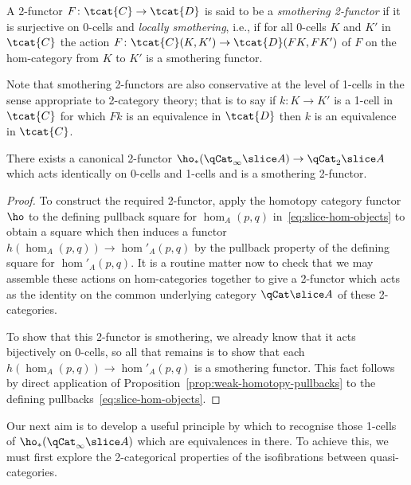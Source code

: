\begin{defn}\label{defn:smothering-2-functor}
  A 2-functor $F\colon\tcat{C}\to\tcat{D}$ is said to be a {\em smothering 2-functor\/} if it is surjective on 0-cells and \emph{locally smothering}, i.e., if for all 0-cells $K$ and $K'$ in $\tcat{C}$ the action $F\colon \tcat{C}(K,K')\to\tcat{D}(FK,FK')$ of $F$ on the hom-category from $K$ to $K'$ is a smothering functor.

Note that smothering 2-functors are also conservative at the level of 1-cells in the sense appropriate to 2-category theory; that is to say if $k\colon K\to K'$ is a 1-cell in $\tcat{C}$ for which $Fk$ is an equivalence in $\tcat{D}$ then $k$ is an equivalence in $\tcat{C}$.
\end{defn}

\begin{prop}\label{prop:slice-smothering-2-functor} There exists a canonical 2-functor $\ho_*(\qCat_\infty\slice A)\to\qCat_2\slice A$  which acts identically on 0-cells and 1-cells and is a smothering 2-functor.
\end{prop}
\begin{proof}
  To construct the required 2-functor, apply the homotopy category functor $\ho$ to the defining pullback square for $\hom_A(p,q)$ in~\eqref{eq:slice-hom-objects} to obtain a square which then induces a functor $h(\hom_A(p,q))\to \hom'_A(p,q)$ by the pullback property of the defining square for $\hom'_A(p,q)$. It is a routine matter now to check that we may assemble these actions on hom-categories together to give a 2-functor which acts as the identity on the common underlying category $\qCat\slice A$ of these 2-categories. 

  To show that this 2-functor is smothering, we already know that it acts bijectively on 0-cells, so all that remains is to show that each $h(\hom_A(p,q))\to \hom'_A(p,q)$ is a smothering functor. This fact follows by direct application of Proposition~\ref{prop:weak-homotopy-pullbacks} to the defining pullbacks~\eqref{eq:slice-hom-objects}.
 \end{proof}

Our next aim is to develop a useful principle by which to recognise those 1-cells of $\ho_*(\qCat_\infty\slice A)$ which are equivalences in there. To achieve this, we must first explore the 2-categorical properties of the isofibrations between quasi-categories.

